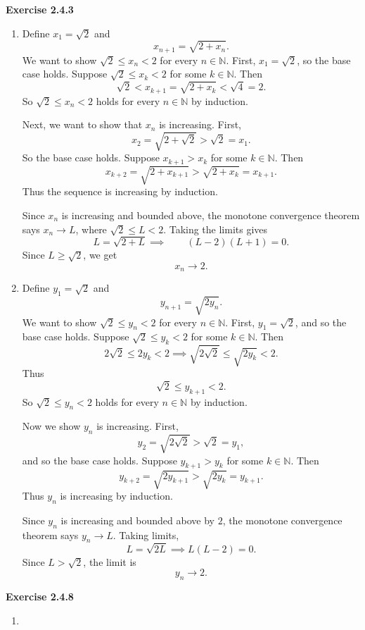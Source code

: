 \documentclass[12pt]{article}
\begin{document}
\textbf{Exercise 2.4.3}
\begin{enumerate}[label=(\alph*)]
    \item Define \( x_1 = \sqrt{2} \) and
          \[
              x_{n+1} = \sqrt{2 + x_n}.
          \]
          We want to show \( \sqrt{2} \leq x_n < 2 \) for every \( n \in \mathbb{N} \).
          First, \( x_1 = \sqrt{2} \), so the base case holds.
          Suppose \( \sqrt{2} \leq x_k < 2 \) for some \( k \in \mathbb{N} \).
          Then
          \[
              \sqrt{2} < x_{k+1} = \sqrt{2 + x_k} < \sqrt{4} = 2.
          \]
          So \( \sqrt{2} \leq x_n < 2 \) holds for every \( n \in \mathbb{N} \) by induction.

          Next, we want to show that \( x_n \) is increasing.
          First,
          \[
              x_2 = \sqrt{2 + \sqrt{2}} > \sqrt{2} = x_1.
          \]
          So the base case holds.
          Suppose \( x_{k+1} > x_k \) for some \( k \in \mathbb{N} \).
          Then
          \[
              x_{k+2} = \sqrt{2 + x_{k+1}} > \sqrt{2 + x_k} = x_{k+1}.
          \]
          Thus the sequence is increasing by induction.

          Since \( x_n \) is increasing and bounded above, the monotone convergence theorem says \( x_n \to L \),
          where \( \sqrt{2} \leq L < 2 \). Taking the limits gives
          \[
              L = \sqrt{2 + L} \implies  \qquad (L-2)(L+1) = 0.
          \]
          Since \( L \geq  \sqrt{2} \), we get
          \[
              x_n \to 2.
          \]


    \item Define \( y_1 = \sqrt{2} \) and
          \[
              y_{n+1} = \sqrt{2y_n}.
          \]
          We want to show \( \sqrt{2} \leq y_n < 2 \) for every \( n \in \mathbb{N} \).
          First, \( y_1 = \sqrt{2} \), and so the base case holds.
          Suppose \( \sqrt{2} \leq y_k < 2 \) for some \( k \in \mathbb{N} \).
          Then
          \[
              2\sqrt{2} \leq 2y_k < 2 \implies \sqrt{2\sqrt{2}} \leq \sqrt{2y_k} < 2.
          \]
          Thus
          \[
              \sqrt{2} \leq y_{k+1} < 2.
          \]
          So \( \sqrt{2} \leq y_n < 2 \) holds for every \( n \in \mathbb{N} \) by induction.

          Now we show \( y_n \) is increasing. First,
          \[
              y_2 = \sqrt{2\sqrt{2}} > \sqrt{2} = y_1,
          \]
          and so the base case holds.
          Suppose \( y_{k+1} > y_k \) for some \( k \in \mathbb{N} \).
          Then
          \[
              y_{k+2} = \sqrt{2y_{k+1}} > \sqrt{2y_k} = y_{k+1}.
          \]
          Thus \( y_n \) is increasing by induction.

          Since \( y_n \) is increasing and bounded above by \( 2 \), the monotone convergence theorem says
          \( y_n \to L \).
          Taking limits,
          \[
              L = \sqrt{2L} \implies L(L-2) = 0.
          \]
          Since \( L > \sqrt{2} \), the limit is
          \[
              y_n \to 2.
          \]
\end{enumerate}

\textbf{Exercise 2.4.8}
\begin{enumerate}[label=(\alph*)]
    \item
\end{enumerate}
\end{document}
